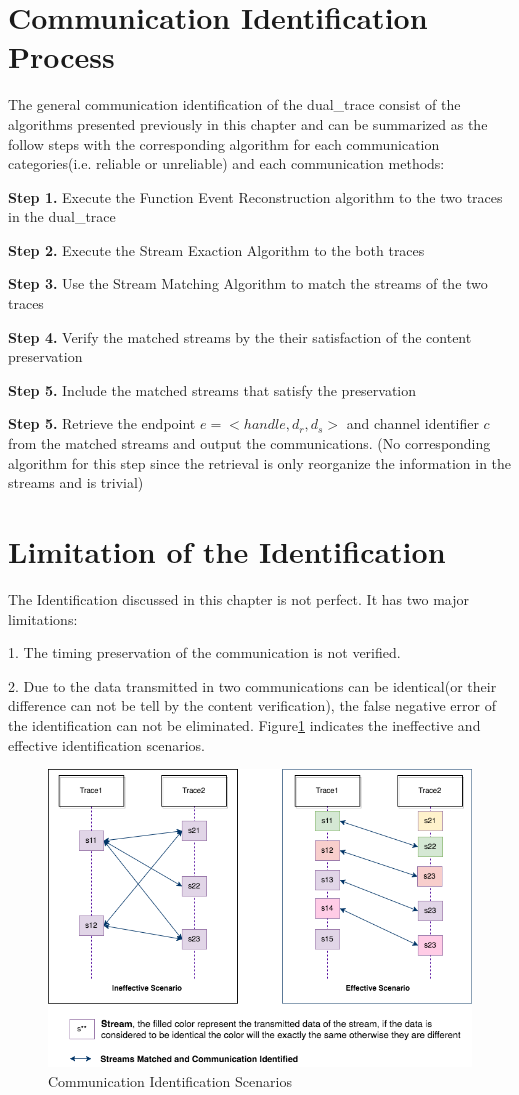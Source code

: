 \section{Communication Identification Process}
The general communication identification of the dual\_trace consist of the algorithms presented previously in this chapter and can be summarized as the follow steps with the corresponding algorithm for each communication categories(i.e. reliable or unreliable) and each communication methods:

\textbf{Step 1.} Execute the Function Event Reconstruction algorithm to the two traces in the dual\_trace

\textbf{Step 2.} Execute the Stream Exaction Algorithm to the both traces 

\textbf{Step 3.} Use the Stream Matching Algorithm to match the streams of the two traces

\textbf{Step 4.} Verify the matched streams by the their satisfaction of the content preservation

\textbf{Step 5.}  Include the matched streams that satisfy the preservation

\textbf{Step 5.}  Retrieve the endpoint $e =<handle,  d_r, d_s>$ and channel identifier $c$ from the matched streams and output the communications. (No corresponding algorithm for this step since the retrieval is only reorganize the information in the streams and is trivial)


\section{Limitation of the Identification}
The Identification discussed in this chapter is not perfect. It has two major limitations:

1. The timing preservation of the communication is not verified.

2. Due to the data transmitted in two communications can be identical(or their difference can not be tell by the content verification), the false negative error of the identification can not be eliminated. Figure\ref{secondlevelmatching} indicates the ineffective and effective identification scenarios. 

\begin{figure}[H]
\centerline{\includegraphics[scale=0.45]{Figures/secondlevelmatching}}
 \caption{Communication Identification Scenarios}
\label{secondlevelmatching}
\end{figure}



